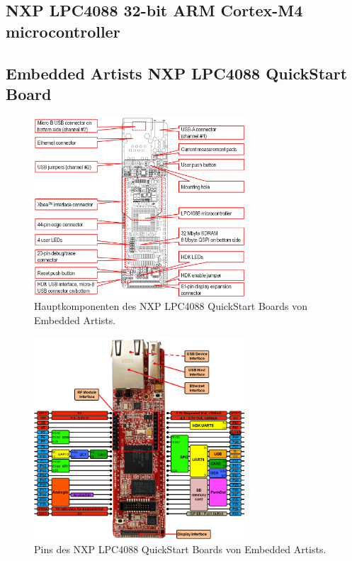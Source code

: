 \subsection{NXP LPC4088 32-bit ARM Cortex-M4 microcontroller}
\label{ds.lpc4088}


\subsection{Embedded Artists NXP LPC4088 QuickStart Board}

\begin{figure}[H]
	\centering		\includegraphics[width=0.7\textwidth]{images/datasheets/lpc4088_qsb_key_components_reva.png}
	\caption{Hauptkomponenten des NXP LPC4088 QuickStart Boards von Embedded Artists.}
	\label{fig.NXP_LPC4088_QSB_comps}
\end{figure}

\begin{figure}[H]
	\centering		\includegraphics[width=0.7\textwidth]{images/datasheets/LPC4088_QSB_pinning_revA_800x769.png}
	\caption{Pins des NXP LPC4088 QuickStart Boards von Embedded Artists.}
	\label{fig.NXP_LPC4088_QSB_pinout}
\end{figure}

